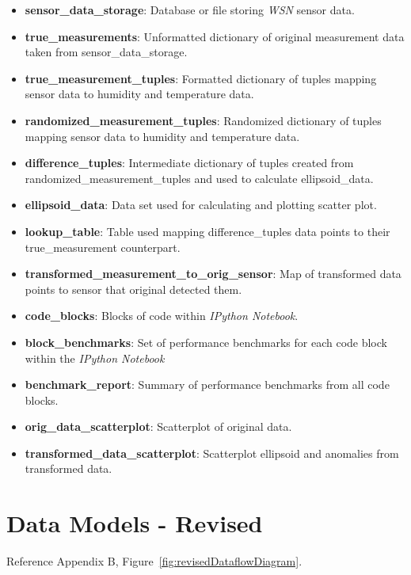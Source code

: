 \documentclass[twoside]{article}
\begin{document}
\begin{multicols}{2}
\begin{itemize}
	\item \textbf{sensor\_data\_storage}: Database or file storing \textit{WSN} sensor data.	
	\item \textbf{true\_measurements}: Unformatted dictionary of original measurement data taken from sensor\_data\_storage.
	\item \textbf{true\_measurement\_tuples}: Formatted dictionary of tuples mapping sensor data to humidity and temperature data.
	\item \textbf{randomized\_measurement\_tuples}: Randomized dictionary of tuples mapping sensor data to humidity and temperature data.
	\item \textbf{difference\_tuples}: Intermediate dictionary of tuples created from randomized\_measurement\_tuples and used to calculate ellipsoid\_data.
	\item \textbf{ellipsoid\_data}: Data set used for calculating and plotting scatter plot.
	\item \textbf{lookup\_table}: Table used mapping difference\_tuples data points to their true\_measurement counterpart.
	\item \textbf{transformed\_measurement\_to\_orig\_sensor}: Map of transformed data points to sensor that original detected them.
	\item \textbf{code\_blocks}: Blocks of code within \textit{IPython Notebook}.
	\item \textbf{block\_benchmarks}: Set of performance benchmarks for each code block within the \textit{IPython Notebook}
	\item \textbf{benchmark\_report}: Summary of performance benchmarks from all code blocks.
	\item \textbf{orig\_data\_scatterplot}: Scatterplot of original data.
	\item \textbf{transformed\_data\_scatterplot}: Scatterplot ellipsoid and anomalies from transformed data.
\end{itemize}


\section{Data Models - Revised}
Reference Appendix B, Figure~\ref{fig:revisedDataflowDiagram}.



\end{multicols}
\end{document}
